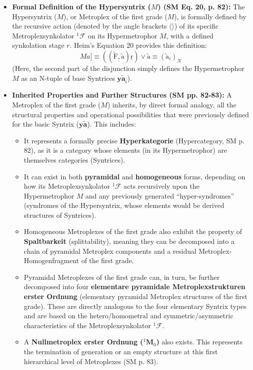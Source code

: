 \documentclass[12pt]{article}
\newcommand{\q}[1]{\enquote{#1}}
\newcommand{\syntrix}{\bm{y\widetilde{a}}}
\def\metroplex#1#2{M}%
\newcommand{\hypersyntrix}{\metroplex{1}{F}}
\newcommand{\hypermetrophor}[1]{%
  \metroplex{#1}{a}%
}
\newcommand{\metroplexsynkolator}[1]{{}^{#1}\mathcal{F}}
\newcommand{\nullmetroplex}[1]{{}^{#1}\mathbf{M}_0}
\begin{document}
\begin{itemize}
    \item \textbf{Formal Definition of the Hypersyntrix (\(\hypersyntrix\)) (SM Eq. 20, p. 82):}
    The Hypersyntrix (\(\hypersyntrix\)), or Metroplex of the first grade (\(\metroplex{1}{}\)), is formally defined by the recursive action (denoted by the angle brackets \( \langle \rangle \)) of its specific Metroplexsynkolator \( \metroplexsynkolator{1} \) on its Hypermetrophor \( \hypermetrophor{1} \), with a defined synkolation stage \( r \). Heim's Equation 20 provides this definition:
    \begin{equation}
\metroplex{1}[a] \equiv \left( (\underline{\tilde{\mathrm{F}}, \tilde{\mathrm{a}}}) \underline{\mathrm{r}} \right) \lor \tilde{\mathrm{a}} \equiv (\tilde{\mathrm{a}}_i)_N
\label{eq:original_metroplex_1}
\end{equation}
    (Here, the second part of the disjunction simply defines the Hypermetrophor \( \hypermetrophor{1} \) as an N-tuple of base Syntrices \( \syntrix_i \)).

    \item \textbf{Inherited Properties and Further Structures (SM pp. 82-83):}
    A Metroplex of the first grade (\(\hypersyntrix\)) inherits, by direct formal analogy, all the structural properties and operational possibilities that were previously defined for the basic Syntrix (\(\syntrix\)). This includes:
    \begin{itemize}
        \item It represents a formally precise \textbf{Hyperkategorie} (Hypercategory, SM p. 82), as it is a category whose elements (in its Hypermetrophor) are themselves categories (Syntrices).
        \item It can exist in both \textbf{pyramidal} and \textbf{homogeneous} forms, depending on how its Metroplexsynkolator \( \metroplexsynkolator{1} \) acts recursively upon the Hypermetrophor \( \hypermetrophor{1} \) and any previously generated \q{hyper-syndromes} (syndromes of the Hypersyntrix, whose elements would be derived structures of Syntrices).
        \item Homogeneous Metroplexes of the first grade also exhibit the property of \textbf{Spaltbarkeit} (splittability), meaning they can be decomposed into a chain of pyramidal Metroplex components and a residual Metroplex-Homogenfragment of the first grade.
        \item Pyramidal Metroplexes of the first grade can, in turn, be further decomposed into four \textbf{elementare pyramidale Metroplexstrukturen erster Ordnung} (elementary pyramidal Metroplex structures of the first grade). These are directly analogous to the four elementary Syntrix types and are based on the hetero/homometral and symmetric/asymmetric characteristics of the Metroplexsynkolator \( \metroplexsynkolator{1} \).
        \item A \textbf{Nullmetroplex erster Ordnung (\( \nullmetroplex{1} \))} also exists. This represents the termination of generation or an empty structure at this first hierarchical level of Metroplexes (SM p. 83).
    \end{itemize}


\end{itemize}
\end{document}
